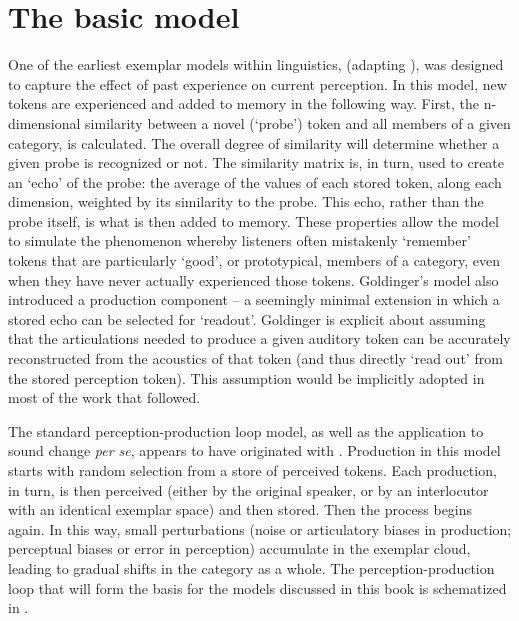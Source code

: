 \chapter{The basic model}\label{ch:The-Exemplar-Model}

One of the earliest exemplar models within linguistics, \citet{Goldinger1996}
(adapting \citet{hintzman1984minerva}), was designed to capture the
effect of past experience on current perception. In this model, new
tokens are experienced and added to memory in the following way. First,
the n-dimensional similarity between a novel (`probe') token and all
members of a given category, is calculated. The overall degree of
similarity will determine whether a given probe is recognized or not.
The similarity matrix is, in turn, used to create an `echo' of the
probe: the average of the values of each stored token, along each
dimension, weighted by its similarity to the probe. This echo, rather
than the probe itself, is what is then added to memory. These properties
allow the model to simulate the phenomenon whereby listeners often
mistakenly `remember' tokens that are particularly `good', or prototypical,
members of a category, even when they have never actually experienced
those tokens. Goldinger's model also introduced a production component
– a seemingly minimal extension in which a stored echo can be selected
for `readout'. Goldinger is explicit about assuming that the articulations
needed to produce a given auditory token can be accurately reconstructed
from the acoustics of that token (and thus directly `read out' from
the stored perception token). This assumption would be implicitly
adopted in most of the work that followed. 

The standard perception-production loop model, as well as the application
to sound change \emph{per se}, appears to have originated with \citet{Pierrehumbert2000}.
Production in this model starts with random selection from a store
of perceived tokens. Each production, in turn, is then perceived (either
by the original speaker, or by an interlocutor with an identical exemplar
space) and then stored. Then the process begins again. In this way,
small perturbations (noise or articulatory biases in production; perceptual
biases or error in perception) accumulate in the exemplar cloud, leading
to gradual shifts in the category as a whole. The perception-production
loop that will form the basis for the models discussed in this book
is schematized in .

